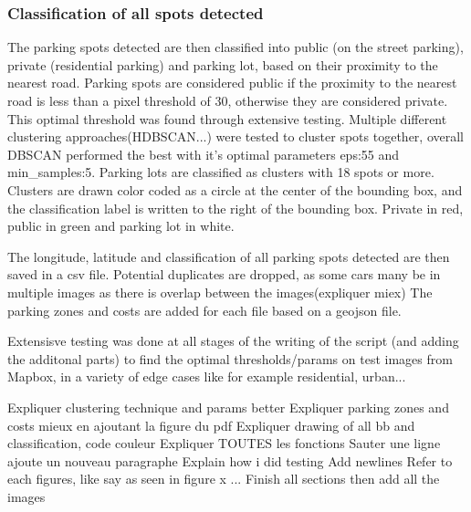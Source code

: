 \subsubsection{Classification of all spots detected}
The parking spots detected are then classified into public (on the street parking), private (residential parking) and parking lot, based on their proximity to the nearest road.
Parking spots are considered public if the proximity to the nearest road is less than a pixel threshold of 30, otherwise they are considered private. This optimal threshold was found through extensive testing.
Multiple different clustering approaches(HDBSCAN...) were tested to cluster spots together, overall DBSCAN performed the best with it's optimal parameters eps:55 and min_samples:5.
Parking lots are classified as clusters with 18 spots or more.
Clusters are drawn color coded as a circle at the center of the bounding box, and the classification label is written to the right of the bounding box. Private in red, public in green and parking lot in white.

The longitude, latitude and classification of all parking spots detected are then saved in a csv file.
Potential duplicates are dropped, as some cars many be in multiple images as there is overlap between the images(expliquer miex)
The parking zones and costs are added for each file based on a geojson file.

Extensisve testing was done at all stages of the writing of the script (and adding the additonal parts) to find the optimal thresholds/params on test images from Mapbox, in a variety of edge cases like for example residential, urban...



Expliquer clustering technique and params better
Expliquer parking zones and costs mieux en ajoutant la figure du pdf
Expliquer drawing of all bb and classification, code couleur
Expliquer TOUTES les fonctions
Sauter une ligne ajoute un nouveau paragraphe
Explain how i did testing
Add newlines
Refer to each figures, like say as seen in figure x ...
Finish all sections then add all the images